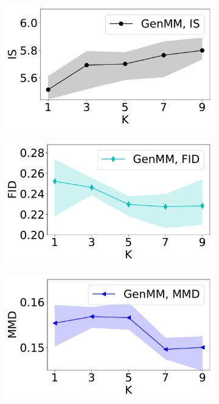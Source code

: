\begin{figure}[!ht]
  \captionsetup[subfigure]{justification=centering}
  \centering
  \begin{subfigure}{.24\textwidth}
    \centering
    \includegraphics[width=1.0\linewidth]{images/fashion-mnist/scores/std1EMGM-NM/EMGM-NM-IS-K.pdf}
  \end{subfigure}
  \vspace{-2pt}
  \begin{subfigure}{.24\textwidth}
    \centering
    \includegraphics[width=1.0\linewidth]{images/fashion-mnist/scores/std1EMGM-NM/EMGM-NM-FID-K.pdf}
  \end{subfigure}
  \centering
  \begin{subfigure}{.24\textwidth}
    \centering
    \includegraphics[width=1\linewidth]{images/fashion-mnist/scores/std1EMGM-NM/EMGM-NM-MMD-K.pdf}

\end{subfigure}
\end{figure}

